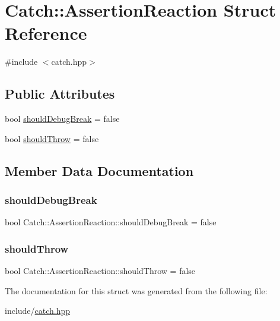 \hypertarget{struct_catch_1_1_assertion_reaction}{}\section{Catch\+::Assertion\+Reaction Struct Reference}
\label{struct_catch_1_1_assertion_reaction}


{\ttfamily \#include $<$catch.\+hpp$>$}

\subsection*{Public Attributes}
\begin{DoxyCompactItemize}
\item 
bool \mbox{\hyperlink{struct_catch_1_1_assertion_reaction_adcf30fb90ff20d9789df78d424652497}{should\+Debug\+Break}} = false
\item 
bool \mbox{\hyperlink{struct_catch_1_1_assertion_reaction_a82c8d95a2c1b6a331bde66982a8e090f}{should\+Throw}} = false
\end{DoxyCompactItemize}


\subsection{Member Data Documentation}
\mbox{\label{struct_catch_1_1_assertion_reaction_adcf30fb90ff20d9789df78d424652497}} 
\subsubsection{\texorpdfstring{shouldDebugBreak}{shouldDebugBreak}}
{\footnotesize\ttfamily bool Catch\+::\+Assertion\+Reaction\+::should\+Debug\+Break = false}

\mbox{\label{struct_catch_1_1_assertion_reaction_a82c8d95a2c1b6a331bde66982a8e090f}} 
\subsubsection{\texorpdfstring{shouldThrow}{shouldThrow}}
{\footnotesize\ttfamily bool Catch\+::\+Assertion\+Reaction\+::should\+Throw = false}



The documentation for this struct was generated from the following file\+:\begin{DoxyCompactItemize}
\item 
include/\mbox{\hyperlink{catch_8hpp}{catch.\+hpp}}\end{DoxyCompactItemize}

